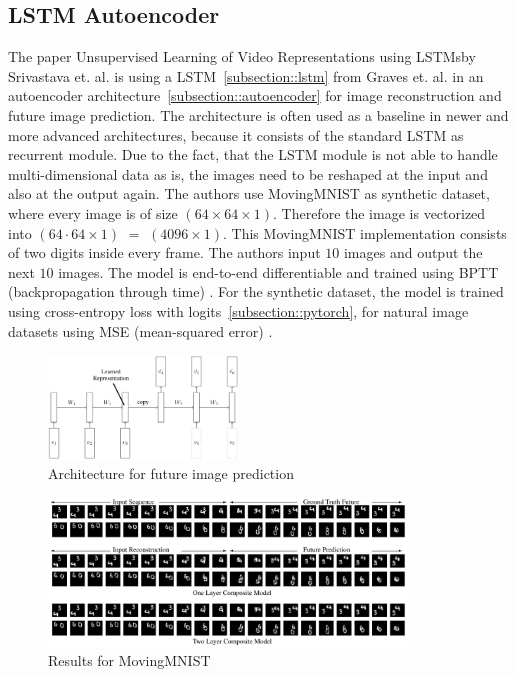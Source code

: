  \subsection{LSTM Autoencoder} \label{subsection::lstm_autoencoder}
  The paper \glqq Unsupervised Learning of Video Representations using LSTMs\grqq by Srivastava et. al. \cite{Srivastava2015} is using a LSTM~\ref{subsection::lstm} from Graves et. al. 
  \cite{Graves2013} in an autoencoder architecture~\ref{subsection::autoencoder} for image reconstruction and future image prediction.
  The architecture is often used as a baseline in newer and more advanced architectures, because it consists of the standard LSTM as recurrent module.
  Due to the fact, that the LSTM module is not able to handle multi-dimensional data as is, the images need to be reshaped at the input and also at the output again. The authors use
  MovingMNIST \cite{LeCun1998} as synthetic dataset, where every image is of size $(64 \times 64 \times 1)$. Therefore the image is vectorized into $(64 \cdot 64 \times 1)$ $=$ $(4096 \times 1)$.
  This MovingMNIST implementation consists of two digits inside every frame. The authors input $10$ images and output the next $10$ images.
  The model is end-to-end differentiable and trained using BPTT (backpropagation through time) \cite{Werbos1990}.
  For the synthetic dataset, the model is trained using cross-entropy loss with logits~\ref{subsection::pytorch}, for natural image
  datasets using MSE (mean-squared error) \cite{Zhao2017}.
  \begin{figure}[H]
   \includegraphics[width=0.45\textwidth]{../Images/srivastava.png}
   \centering
   \caption{Architecture for future image prediction \cite{Srivastava2015}}
   \label{fig:lstm_architecture}
  \end{figure}
  \begin{figure}[H]
   \includegraphics[width=0.85\textwidth]{../Images/srivastava_results_mnist.png}
   \centering
   \caption{Results for MovingMNIST \cite{Srivastava2015}}
   \label{fig:lstm_results}
  \end{figure}

